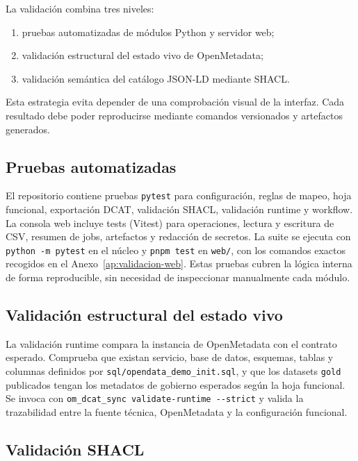La validación combina tres niveles:

\begin{enumerate}
  \item pruebas automatizadas de módulos Python y servidor web;
  \item validación estructural del estado vivo de OpenMetadata;
  \item validación semántica del catálogo JSON-LD mediante SHACL.
\end{enumerate}

Esta estrategia evita depender de una comprobación visual de la interfaz. Cada resultado debe poder reproducirse mediante comandos versionados y artefactos generados.

\subsection{Pruebas automatizadas}

El repositorio contiene pruebas \texttt{pytest} para configuración, reglas de mapeo, hoja funcional, exportación DCAT, validación SHACL, validación runtime y workflow. La consola web incluye tests (Vitest) para operaciones, lectura y escritura de CSV, resumen de jobs, artefactos y redacción de secretos. La suite se ejecuta con \texttt{python -m pytest} en el núcleo y \texttt{pnpm test} en \texttt{web/}, con los comandos exactos recogidos en el Anexo~\ref{ap:validacion-web}. Estas pruebas cubren la lógica interna de forma reproducible, sin necesidad de inspeccionar manualmente cada módulo.

\subsection{Validación estructural del estado vivo}

La validación runtime compara la instancia de OpenMetadata con el contrato esperado. Comprueba que existan servicio, base de datos, esquemas, tablas y columnas definidos por \texttt{sql/opendata\_demo\_init.sql}, y que los datasets \texttt{gold} publicados tengan los metadatos de gobierno esperados según la hoja funcional. Se invoca con \texttt{om\_dcat\_sync validate-runtime -{}-strict} y valida la trazabilidad entre la fuente técnica, OpenMetadata y la configuración funcional.

\subsection{Validación SHACL}

